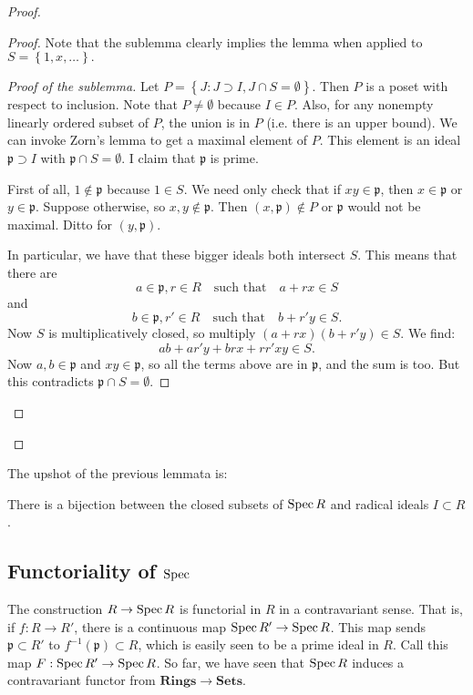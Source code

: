 \begin{proof}
\begin{proof}
Note that the sublemma clearly implies the lemma when applied to
$S =
\left\{1, x, \dots\right\}.$

\begin{proof}[Proof of the sublemma]
Let $P = \left\{J: J \supset I, J \cap S = \emptyset \right\}$.
Then $P$ is a
poset with respect to inclusion. Note that $P \neq \emptyset$
because $I \in P$. Also,
for any nonempty linearly ordered subset of $P$, the union is in
$P$ (i.e. there is an
upper bound).  
We can invoke Zorn's lemma to get a maximal element of $P$. This
element is an
ideal $\mathfrak{p} \supset I$ with $\mathfrak{p} \cap S =
\emptyset$. I claim
that $\mathfrak{p}$ is prime.

First of all, $1 \notin \mathfrak{p}$ because $1 \in S$. We need
only check
that if $xy \in \mathfrak{p}$, then $x \in \mathfrak{p}$ or $y
\in
\mathfrak{p}$. Suppose otherwise, so $x,y \notin \mathfrak{p}$.
Then $(x,\mathfrak{p}) \notin P$ or
$\mathfrak{p}$ would not be maximal. Ditto for $(y,
\mathfrak{p})$.

In particular, we have that these bigger ideals both intersect
$S$. This means
that there are 
\[ a \in \mathfrak{p} , r \in R \quad \text{such that}\quad a+rx
\in S \]
and 
\[ b \in \mathfrak{p} , r' \in R \quad \text{such that}\quad
b+r'y \in S .\]
Now $S$ is multiplicatively closed, so multiply $(a+rx)(b+r'y)
\in S$.
We find:
\[ ab + ar'y+brx+rr'xy \in S.  \]
Now $a,b \in \mathfrak{p}$ and $xy \in \mathfrak{p}$, so all the
terms above
are in $\mathfrak{p}$, and the sum is too. But this contradicts
$\mathfrak{p}
\cap S = \emptyset$. 
\end{proof}
\end{proof} 
\end{proof} 

The upshot of the previous lemmata is:
\begin{proposition}
There is a bijection between the closed subsets of $\operatorname{Spec} R$ and
radical ideals
$I \subset R$.
\end{proposition}

\subsection{Functoriality of $\operatorname{Spec}$}
 The construction $R \to \operatorname{Spec} R$ is functorial in $R$ in a
contravariant sense. That is, if $f: R \to R'$, there is a
continuous map $\operatorname{Spec}
R' \to \operatorname{Spec} R$. This map sends $\mathfrak{p} \subset R'$ to
$f^{-1}(\mathfrak{p}) \subset R$, which is easily seen to be a
prime ideal
in $R$. Call this map $F: \operatorname{Spec} R' \to \operatorname{Spec} R$. So far, we have
seen that
$\operatorname{Spec} R$ induces a contravariant functor from $\mathbf{Rings}
\to \mathbf{Sets}$.

